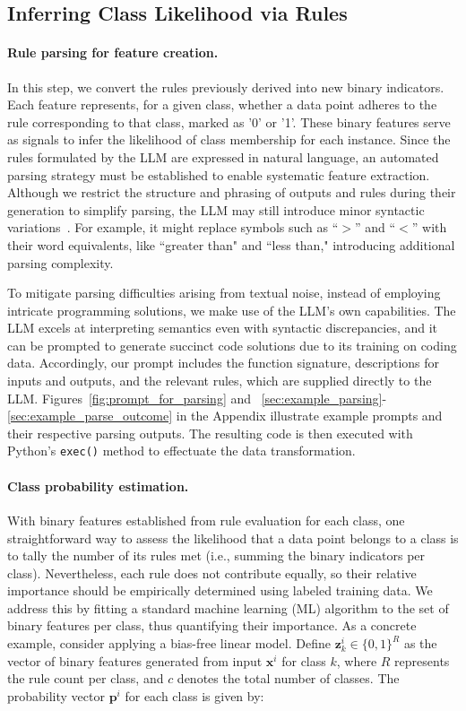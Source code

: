\subsection{Inferring Class Likelihood via Rules}
\label{Sec:training}

\paragraph{Rule parsing for feature creation.} In this step, we convert the rules previously derived into new binary indicators. Each feature represents, for a given class, whether a data point adheres to the rule corresponding to that class, marked as '0' or '1'. These binary features serve as signals to infer the likelihood of class membership for each instance. Since the rules formulated by the LLM are expressed in natural language, an automated parsing strategy must be established to enable systematic feature extraction. Although we restrict the structure and phrasing of outputs and rules during their generation to simplify parsing, the LLM may still introduce minor syntactic variations~\cite{kovavc2023large}. For example, it might replace symbols such as ``$>$” and ``$<$” with their word equivalents, like ``greater than" and ``less than," introducing additional parsing complexity.

To mitigate parsing difficulties arising from textual noise, instead of employing intricate programming solutions, we make use of the LLM's own capabilities. The LLM excels at interpreting semantics even with syntactic discrepancies, and it can be prompted to generate succinct code solutions due to its training on coding data. Accordingly, our prompt includes the function signature, descriptions for inputs and outputs, and the relevant rules, which are supplied directly to the LLM. Figures~\ref{fig:prompt_for_parsing} and ~\ref{sec:example_parsing}-\ref{sec:example_parse_outcome} in the Appendix illustrate example prompts and their respective parsing outputs. The resulting code is then executed with Python’s \texttt{exec()} method to effectuate the data transformation.

\vspace*{-0.12in}
\paragraph{Class probability estimation.} With binary features established from rule evaluation for each class, one straightforward way to assess the likelihood that a data point belongs to a class is to tally the number of its rules met (i.e., summing the binary indicators per class). Nevertheless, each rule does not contribute equally, so their relative importance should be empirically determined using labeled training data. We address this by fitting a standard machine learning (ML) algorithm to the set of binary features per class, thus quantifying their importance. As a concrete example, consider applying a bias-free linear model. Define $\mathbf{z}_k^i \in \{0, 1\}^R$ as the vector of binary features generated from input $\mathbf{x}^i$ for class $k$, where $R$ represents the rule count per class, and $c$ denotes the total number of classes. The probability vector $\mathbf{p}^i$ for each class is given by:

